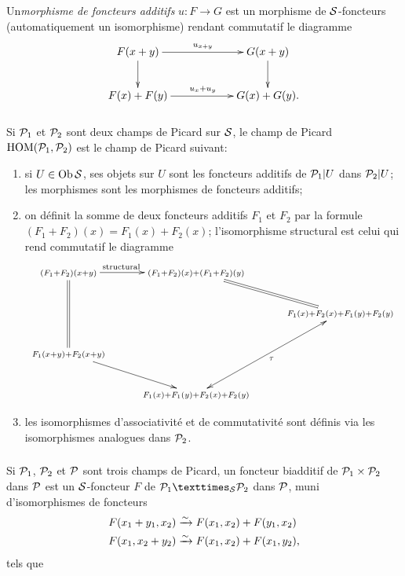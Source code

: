 \documentclass[10pt]{../fichiers-configuration-latex/smfart}
\begin{document}
Un\pageoriginale \emph{morphisme de foncteurs additifs}
$u:F\rightarrow G$ est un 
morphisme de ${\mathcal S}$-foncteurs (automatiquement un isomorphisme)
rendant commutatif le diagramme
$$\vcenter{
\xymatrix@C=2cm{
F(x+y)       \ar[r]^{u_{x+y}} \ar[d]       & G(x+y) \ar[d]\\
F(x) + F(y)  \ar[r]^{u_x + u_y}     & G(x) + G(y). 
}}
$$

\subsubsection{}
Si ${\mathcal P}_{1}$ et ${\mathcal P}_{2}$ sont deux champs de Picard
sur ${\mathcal S}$, le champ de Picard
$\operatorname{HOM}({\mathcal P}_{1},{\mathcal P}_{2})$ est le champ de Picard
suivant:
\begin{enumerate}
\renewcommand{\theenumi}{\alph{enumi}}
\renewcommand{\labelenumi}{\theenumi)}
\item si $U\in \operatorname{Ob} {\mathcal S}$, ses objets sur $U$ sont les foncteurs
additifs de ${\mathcal P}_{1}|U$ dans ${\mathcal P}_{2}|U$; les
morphismes sont les morphismes de foncteurs additifs;

\item on définit la somme de deux foncteurs additifs $F_{1}$ et
$F_{2}$ par la formule $(F_{1}+F_{2})(x)=F_{1}(x)+F_{2}(x)$;
l'isomorphisme structural est celui qui rend commutatif le diagramme
$$
\xymatrix@C=1cm{
\scriptstyle{(F_1 + F_2)(x+y)} \ar[r]^{\rm{\scriptstyle{structural\qquad}}}\ar@{=}[dd]& \scriptstyle{(F_1 + F_2)(x) + (F_1 + F_2)(y)}\ar@{=}[rd]& \\
                                 & &\scriptstyle{F_1(x) + F_2(x) +  F_1(y)+F_2(y)}\\
\scriptstyle{F_1(x+y)+F_2(x+y)}\ar[rd]                    & &\\
&\scriptstyle{F_1(x) + F_1(y) + F_2(x) + F_2(y)}\ar@{<->}[ruu]_{\tau}&
}
$$

\item les isomorphismes d'associativité et de commutativité sont
définis via les isomorphismes analogues dans ${\mathcal P}_{2}$.
\end{enumerate}

\subsubsection{}
Si ${\mathcal P}_{1}$, ${\mathcal P}_{2}$ et ${\mathcal P}$ sont trois
champs de Picard, un foncteur biadditif de ${\mathcal P}_{1}\times
{\mathcal P}_{2}$ dans ${\mathcal P}$ est un ${\mathcal S}$-foncteur $F$
de $\fprod{\Pp_{1}}{\Pp_{2}}{\Ss}$ dans ${\mathcal P}$,
muni d'isomorphismes de foncteurs
\begin{align*}
F(x_{1}+y_{1},x_{2}) &\xrightarrow{\sim} F(x_{1},
x_{2})+F(y_{1},x_{2})\\
F(x_{1}, x_{2}+y_{2}) &\xrightarrow{\sim} F(x_{1}, x_{2})+F(x_{1},
y_{2}){},
\end{align*}
tels que
\end{document}
